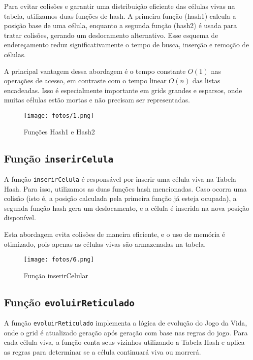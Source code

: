 \documentclass[a4paper,12pt]{article}
\begin{document}
Para evitar colisões e garantir uma distribuição eficiente das células vivas na tabela, utilizamos duas funções de hash. A primeira função (hash1) calcula a posição base de uma célula, enquanto a segunda função (hash2) é usada para tratar colisões, gerando um deslocamento alternativo. Esse esquema de endereçamento reduz significativamente o tempo de busca, inserção e remoção de células.

A principal vantagem dessa abordagem é o tempo constante \(O(1)\) nas operações de acesso, em contraste com o tempo linear \(O(n)\) das listas encadeadas. Isso é especialmente importante em grids grandes e esparsos, onde muitas células estão mortas e não precisam ser representadas.

\begin{figure}[H]
    \centering
    \texttt{[image: fotos/1.png]}
    \caption{Funções Hash1 e Hash2}
\end{figure}

\subsection{Função \texttt{inserirCelula}}

A função \texttt{inserirCelula} é responsável por inserir uma célula viva na Tabela Hash. Para isso, utilizamos as duas funções hash mencionadas. Caso ocorra uma colisão (isto é, a posição calculada pela primeira função já esteja ocupada), a segunda função hash gera um deslocamento, e a célula é inserida na nova posição disponível.

Esta abordagem evita colisões de maneira eficiente, e o uso de memória é otimizado, pois apenas as células vivas são armazenadas na tabela.

\begin{figure}[H]
    \centering
    \texttt{[image: fotos/6.png]}
    \caption{Função inserirCelular}
\end{figure}

\subsection{Função \texttt{evoluirReticulado}}

A função \texttt{evoluirReticulado} implementa a lógica de evolução do Jogo da Vida, onde o grid é atualizado geração após geração com base nas regras do jogo. Para cada célula viva, a função conta seus vizinhos utilizando a Tabela Hash e aplica as regras para determinar se a célula continuará viva ou morrerá.
\end{document}
